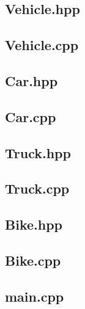 \documentclass[12pt,naustrian,a4widepaper]{scrartcl}
\begin{document}
\subsection{Vehicle.hpp}

\clearpage
\subsection{Vehicle.cpp}

\clearpage

\subsection{Car.hpp}

\clearpage

\subsection{Car.cpp}


\clearpage
\subsection{Truck.hpp}

\clearpage

\subsection{Truck.cpp}

\clearpage

\subsection{Bike.hpp}


\clearpage
\subsection{Bike.cpp}

\clearpage
\subsection{main.cpp}


%


\end{document}
